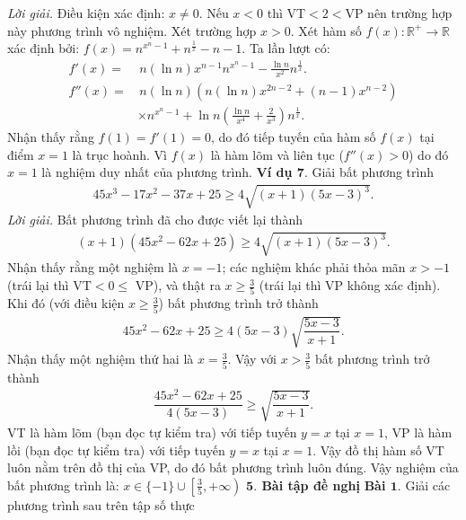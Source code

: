 \begin{multicols}{2}
	\textit{Lời giải.} Điều kiện xác định: $x \neq 0$. 
	Nếu $x<0$ thì VT$<2<$VP nên trường hợp này phương trình vô nghiệm.
	\vskip 0.1cm
	Xét trường hợp $x>0$. Xét hàm số $f(x):\mathbb R^+\to \mathbb R$ xác định bởi: $f(x)=n^{x^n-1}+n^{\frac 1x}-n-1$.
	\vskip 0.1cm
	Ta lần lượt có:
	\begin{align*}
		f'(x)=&\,n(\ln n)x^{n-1}n^{x^n-1}-\frac {\ln n}{x^2}n^{\frac 1x}.\\
		f''(x)=&\,n(\ln n)\left(n(\ln n)x^{2n-2}+(n-1)x^{n-2}\right)\\
		&\times n^{x^n-1}+\ln n\left(\frac {\ln n}{x^4}+\frac 2{x^3}\right)n^{\frac 1x}.
	\end{align*}
	Nhận thấy rằng $f(1)=f'(1)=0$, do đó tiếp tuyến của hàm số $f(x)$ tại điểm $x=1$ là trục hoành.
	\vskip 0.1cm 
	Vì $f(x)$ là hàm lõm và liên tục ($f''(x)>0$) do đó $x=1$ là nghiệm duy nhất của phương trình. 
	\vskip 0.1cm
	\textbf{\color{diendantoanhoc}Ví dụ $\pmb{7.}$} Giải bất phương trình
	\begin{align*}
		45x^3\!-\!17x^2\!-\!37x\!+\!25\!\ge\! 4\sqrt{\!\!(x\!+\!1)(5x\!-\!3)^3}.
	\end{align*}
	\textit{Lời giải.} Bất phương trình đã cho được viết lại thành 
	\begin{align*}
		(x\!+\!1\!)(45x^2\!-\!62x\!+\!25)\!\ge\! 4\sqrt{\!\!(x\!+\!1\!)(5x\!-\!3)^3}.
	\end{align*}
	Nhận thấy rằng một nghiệm là $x=-1$; các nghiệm khác phải thỏa mãn $x>-1$ (trái lại thì VT$<0\le$ VP), và thật ra $x\ge\frac 35$ (trái lại thì VP không xác định).
	\vskip 0.1cm
	Khi đó (với điều kiện $x\ge\frac 35$) bất phương trình trở thành
	\begin{align*}
		45x^2-62x+25\ge 4(5x-3)\sqrt{\dfrac{5x-3}{x+1}}.
	\end{align*}
	Nhận thấy một nghiệm thứ hai là $x=\frac 35$. Vậy với $x>\frac 35$ bất phương trình trở thành
	\begin{align*}
		\dfrac{45x^2-62x+25}{4(5x-3)}\ge \sqrt{\dfrac{5x-3}{x+1}}.
	\end{align*}
	VT là hàm lõm (bạn đọc tự kiểm tra) với tiếp tuyến $y=x$ tại $x=1$, VP là hàm lồi (bạn đọc tự kiểm tra) với tiếp tuyến $y=x$ tại $x=1$. Vậy đồ thị hàm số VT luôn nằm trên đồ thị của VP,  do đó bất phương trình luôn đúng.
	\vskip 0.1cm
	Vậy nghiệm của bất phương trình là: \linebreak $x\in\{-1\}\cup\left[\frac 35,+\infty\right)$
	\vskip 0.1cm
	\textbf{\color{diendantoanhoc}$\pmb{5.}$ Bài tập đề nghị}
	\vskip 0.1cm
	\textbf{\color{diendantoanhoc}Bài $\pmb{1.}$} Giải các phương trình sau trên tập số thực

\end{multicols}
